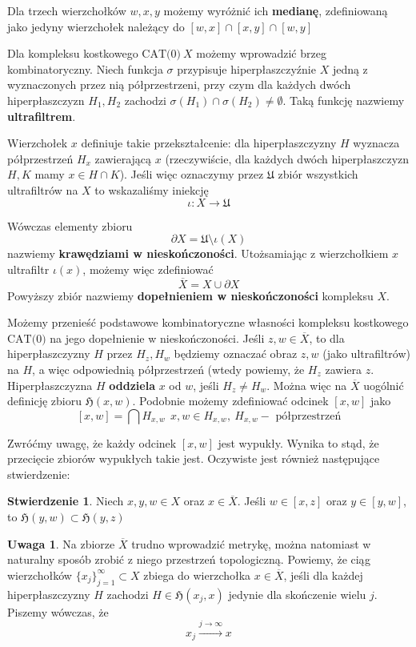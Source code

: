 \documentclass[licencjacka]{pracamgr}
\theoremstyle{definition}
\theoremstyle{definition}
\newtheorem{remark}{Uwaga}[section]
\theoremstyle{definition}
\newtheorem{proposition}{Stwierdzenie}[section]
\theoremstyle{definition}
\theoremstyle{definition}
\theoremstyle{plain}
\theoremstyle{plain}
\begin{document}
Dla trzech wierzchołków $ w,x,y $ możemy wyróżnić ich \textbf{medianę}, zdefiniowaną 
jako jedyny wierzchołek należący do $ [w,x] \cap [x,y] \cap [w,y] $

Dla kompleksu kostkowego $ \text{CAT(0)}~ X$ możemy wprowadzić brzeg kombinatoryczny. 
Niech funkcja $ \sigma $ przypisuje hiperpłaszczyźnie $ X $ jedną z wyznaczonych przez nią 
półprzestrzeni, przy czym dla każdych dwóch hiperpłaszczyzn $ H_1, H_2 $ zachodzi 
$ \sigma(H_1) \cap \sigma(H_2) \neq \emptyset $. Taką funkcję nazwiemy \textbf{ultrafiltrem}.

Wierzchołek $ x $ definiuje takie przekształcenie: dla hiperpłaszczyzny $ H $ wyznacza 
półprzestrzeń $ H_x $ zawierającą $ x $ (rzeczywiście, dla każdych dwóch hiperpłaszczyzn 
$ H,K $ mamy $ x \in H \cap K $). Jeśli więc oznaczymy przez $\mathfrak{U}$ zbiór wszystkich 
ultrafiltrów na $ X $ to wskazaliśmy iniekcję 
$$ \iota : X \rightarrow \mathfrak{U} $$

Wówczas elementy zbioru $$ \partial X = \mathfrak{U} \setminus \iota(X) $$
nazwiemy \textbf{krawędziami w nieskończoności}. Utożsamiając z wierzchołkiem $ x $ 
ultrafiltr $ \iota(x) $, możemy więc zdefiniować
$$ \overline{X} = X \cup \partial X $$
Powyższy zbiór nazwiemy \textbf{dopełnieniem w nieskończoności} kompleksu $ X $.

Możemy przenieść podstawowe kombinatoryczne własności 
kompleksu kostkowego $ \text{CAT(0)}$ 
na jego dopełnienie w nieskończoności. Jeśli $ z,w \in \overline{X} $, to dla 
hiperpłaszczyzny $ H $ przez $ H_z, H_w $ będziemy oznaczać obraz $ z,w $ 
(jako ultrafiltrów) na 
$ H $, a więc odpowiednią półprzestrzeń (wtedy powiemy, że $ H_z $ zawiera $ z $. 
Hiperpłaszczyzna $ H $ \textbf{oddziela} $ x $ od $ w $, 
jeśli $ H_z \neq H_w $. Można więc na $ \overline{X} $ uogólnić definicję zbioru 
$ \mathfrak{H}(x,w)$. Podobnie możemy zdefiniować odcinek $ [x,w] $ jako 
$$ [x,w] = \bigcap H_{x,w}  ~~ x,w \in H_{x,w}, ~ H_{x,w} - \text{ półprzestrzeń}$$

Zwróćmy uwagę, że każdy odcinek $ [x,w] $ jest wypukły. Wynika to stąd, że przecięcie 
zbiorów wypukłych takie jest. Oczywiste jest również następujące stwierdzenie: 

\begin{proposition}
	Niech $ x,y,w \in X $ oraz $ x \in \overline{X} $. Jeśli $ w \in [x,z] $ oraz 
	$ y \in [y,w] $, to $ \mathfrak{H}(y,w) \subset \mathfrak{H}(y,z)$
\end{proposition}

\begin{remark}
	Na zbiorze $ \overline{X} $ trudno wprowadzić metrykę, można natomiast w naturalny 
	sposób zrobić z niego przestrzeń topologiczną. Powiemy, że ciąg wierzchołków 
	$ \{x_j\}_{j = 1}^{\infty} \subset X $ zbiega do wierzchołka $ x \in \overline{X} $, jeśli 
	dla każdej hiperpłaszczyzny $ H $ zachodzi $ H \in \mathfrak{H}(x_j, x) $ jedynie 
	dla skończenie wielu $ j $. Piszemy wówczas, że $$ x_j 
	\xrightarrow{j \rightarrow \infty} x $$
\end{remark}
\end{document}
